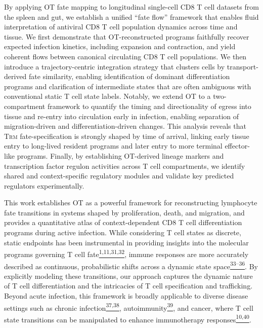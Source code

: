 By applying OT fate mapping to longitudinal single-cell CD8 T cell
datasets from the spleen and gut, we establish a unified ``fate flow''
framework that enables fluid interpretation of antiviral CD8 T cell
population dynamics across time and tissue. We first demonstrate that
OT-reconstructed programs faithfully recover expected infection
kinetics, including expansion and contraction, and yield coherent flows
between canonical circulating CD8 T cell populations. We then introduce
a trajectory-centric integration strategy that clusters cells by
transport-derived fate similarity, enabling identification of dominant
differentiation programs and clarification of intermediate states that
are often ambiguous with conventional static T cell state labels.
Notably, we extend OT to a two-compartment framework to quantify the
timing and directionality of egress into tissue and re-entry into
circulation early in infection, enabling separation of migration-driven
and differentiation-driven changes. This analysis reveals that
T\textsc{rm} fate-specification is strongly shaped by time of arrival,
linking early tissue entry to long-lived resident programs and later
entry to more terminal effector-like programs. Finally, by establishing
OT-derived lineage markers and transcription factor regulon activities
across T cell compartments, we identify shared and context-specific
regulatory modules and validate key predicted regulators experimentally.

This work establishes OT as a powerful framework for reconstructing
lymphocyte fate transitions in systems shaped by proliferation, death,
and migration, and provides a quantitative atlas of context-dependent
CD8 T cell differentiation programs during active infection. While
considering T cell states as discrete, static endpoints has been
instrumental in providing insights into the molecular programs governing
T cell
fate\href{https://sciwheel.com/work/citation?ids=13830433,17904669,1306567,808308\&pre=\&pre=\&pre=\&pre=\&suf=\&suf=\&suf=\&suf=\&sa=0,0,0,0\&dbf=0\&dbf=0\&dbf=0\&dbf=0}{\textsuperscript{1,11,31,32}},
immune responses are more accurately described as continuous,
probabilistic shifts across a dynamic state
space\href{https://sciwheel.com/work/citation?ids=425675,11099644,16029036,1306566\&pre=\&pre=\&pre=\&pre=\&suf=\&suf=\&suf=\&suf=\&sa=0,0,0,0\&dbf=0\&dbf=0\&dbf=0\&dbf=0}{\textsuperscript{33--36}}.
By explicitly modeling these transitions, our approach captures the
dynamic nature of T cell differentiation and the intricacies of T cell
specification and trafficking. Beyond acute infection, this framework is
broadly applicable to diverse disease settings such as chronic
infection\href{https://sciwheel.com/work/citation?ids=13843025,14304004\&pre=\&pre=\&suf=\&suf=\&sa=0,0\&dbf=0\&dbf=0}{\textsuperscript{37,38}},
autoimmunity\href{https://sciwheel.com/work/citation?ids=12129174\&pre=\&suf=\&sa=0\&dbf=0}{\textsuperscript{39}},
and cancer, where T cell state transitions can be manipulated to enhance
immunotherapy
responses\href{https://sciwheel.com/work/citation?ids=10526050,18201304\&pre=\&pre=\&suf=\&suf=\&sa=0,0\&dbf=0\&dbf=0}{\textsuperscript{10,40}}.

